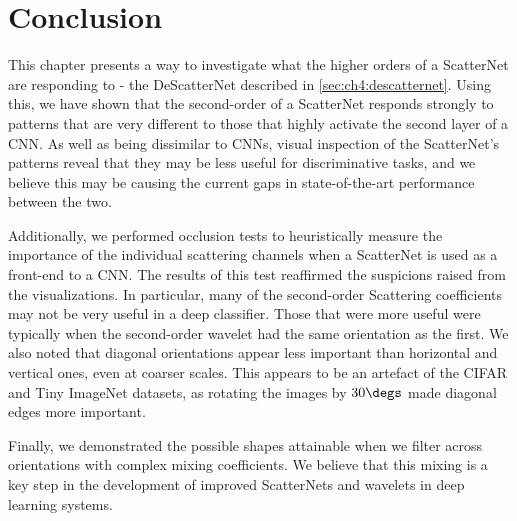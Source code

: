 \section{Conclusion}
This chapter presents a way to investigate what the higher orders of a ScatterNet
are responding to - the DeScatterNet described in \autoref{sec:ch4:descatternet}.
Using this, we have shown that the second-order of a ScatterNet
responds strongly to patterns that are very different to those that highly activate the
second layer of a CNN\@. As well as being dissimilar to CNNs, visual inspection of the
ScatterNet's patterns reveal that they may be less useful for discriminative
tasks, and we believe this may be causing the current gaps in state-of-the-art
performance between the two.

Additionally, we performed occlusion tests to heuristically measure the
importance of the individual scattering channels when a ScatterNet is used as a
front-end to a CNN. The results of this test
reaffirmed the suspicions raised from the visualizations. In particular, many of
the second-order Scattering coefficients may not be very useful in a deep
classifier. Those that were more useful were typically when the second-order wavelet
had the same orientation as the first. We also noted that diagonal
orientations appear less important than horizontal and vertical ones, even at
coarser scales. This appears to be an artefact of the CIFAR and Tiny ImageNet
datasets, as rotating the images by $30\degs$ made diagonal edges more
important.

Finally, we demonstrated the possible shapes attainable when we filter
across orientations with complex mixing coefficients. We believe that this
mixing is a key step in the development of improved ScatterNets and wavelets in deep
learning systems.

